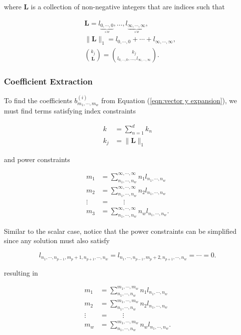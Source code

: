 where $\mathbf{L}$ is a collection of non-negative integers that are indices such that

\begin{align*}
    &\mathbf{L} = l_{\underbrace{0, \cdots, 0}_{\times w}}, \ldots, l_{\underbrace{\infty, \cdots, \infty}_{\times w}}, \\
    &\lVert \mathbf{L} \rVert_1 = l_{0, \cdots, 0} + \cdots + l_{\infty, \cdots, \infty}, \\
    &\binom{k_j}{\mathbf{L}} = \binom{k_j}{l_{0, \cdots, 0}, \ldots, l_{\infty, \cdots, \infty}}.
\end{align*}

\subsubsection{Coefficient Extraction}

To find the coefficients $b^{(i)}_{m_1, \cdots, m_w}$ from Equation (\ref{eqn:vector y expansion}), we must find terms satisfying index constraints

\begin{align}
    k &= \sum_{n=1}^{d} k_n \\
    k_j &= \lVert \mathbf{L} \rVert_1
\end{align}

and power constraints

\begin{align}
    m_1 &= \sum_{n_1, \cdots, n_w}^{\infty, \cdots, \infty} n_1 l_{n_1, \cdots, n_w} \nonumber \\
    m_2 &= \sum_{n_1, \cdots, n_w}^{\infty, \cdots, \infty} n_2 l_{n_1, \cdots, n_w} \nonumber \\
    \vdots \;\; &= \qquad \vdots \nonumber \\
    m_3 &= \sum_{n_1, \cdots, n_w}^{\infty, \cdots, \infty} n_w l_{n_1, \cdots, n_w}.
\end{align}

Similar to the scalar case, notice that the power constraints can be simplified since any solution must also satisfy

\begin{equation}
    l_{n_1, \cdots, n_{p-1}, m_p + 1, n_{p+1}, \cdots, n_w} = l_{n_1, \cdots, n_{p-1}, m_p + 2, n_{p+1}, \cdots, n_w} = \cdots = 0.
\end{equation}

resulting in

\begin{align}
    m_1 &= \sum_{n_1, \cdots, n_w}^{m_1, \cdots, m_w} n_1 l_{n_1, \cdots, n_w} \nonumber \\
    m_2 &= \sum_{n_1, \cdots, n_w}^{m_1, \cdots, m_w} n_2 l_{n_1, \cdots, n_w} \nonumber \\
    \vdots \;\; &= \qquad \vdots \nonumber \\
    m_w &= \sum_{n_1, \cdots, n_w}^{m_1, \cdots, m_w} n_w l_{n_1, \cdots, n_w}.
\end{align}

